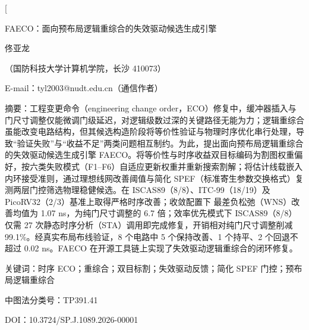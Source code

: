 \documentclass[twocolumn,10pt]{ctexart}
\let\songti\songfamily\let\heiti\heifamily\let\fangsong\fangfamily
\begin{document}
\pagestyle{plain}

\twocolumn[
\begin{center}
{\heiti{} FAECO：面向预布局逻辑重综合的失效驱动候选生成引擎}\par
\vspace{6pt}
{\fangsong{} 佟亚龙}\par
\vspace{4pt}
{\songti\fontsize{8}{12}\selectfont（国防科技大学计算机学院，长沙 410073）}\par\vspace{2pt}
{\songti\fontsize{8}{12}\selectfont E-mail：tyl2003@nudt.edu.cn（通信作者）}\par
\vspace{8pt}
\end{center}
\begin{flushleft}
{\heiti\fontsize{8.5}{13}\selectfont 摘\quad 要：}{\songti\fontsize{8.5}{13}\selectfont 工程变更命令（engineering change order，ECO）修复中，缓冲器插入与门尺寸调整仅能微调门级延迟，对逻辑级数过深的关键路径无能为力；逻辑重综合虽能改变电路结构，但其候选构造阶段将等价性验证与物理时序优化串行处理，导致“验证失败”与“收益不足”两类问题相互制约。为此，提出面向预布局逻辑重综合的失效驱动候选生成引擎 FAECO。将等价性与时序收益双目标编码为割图权重偏好，按六类失败模式（F1--F6）自适应更新权重并重新搜索割解；将估计线载嵌入内环接受准则，通过理想线网改善阈值与简化 SPEF（标准寄生参数交换格式）复测两层门控筛选物理稳健候选。在 ISCAS89（8/8）、ITC-99（18/19）及 PicoRV32（2/3）基准上取得严格时序改善；收敛配置下 最差负松弛（WNS）改善均值为 1.07 ns，为纯门尺寸调整的 6.7 倍；效率优先模式下 ISCAS89（8/8）仅需 27 次静态时序分析（STA）调用即完成修复，开销相对纯门尺寸调整削减 99.1\%。经真实布局布线验证，8 个电路中 5 个保持改善、1 个持平、2 个回退不超过 0.02 ns。FAECO 在开源工具链上实现了失效驱动逻辑重综合的闭环修复。}
\par
\vspace{4pt}
{\heiti\fontsize{8.5}{13}\selectfont 关键词：}{\songti\fontsize{8.5}{13}\selectfont 时序 ECO；重综合；双目标割；失效驱动反馈；简化 SPEF 门控；预布局逻辑重综合}\par
\vspace{2pt}
{\songti\fontsize{8.5}{13}\selectfont 中图法分类号：TP391.41}\par
\vspace{2pt}
{\songti\fontsize{8.5}{13}\selectfont DOI：10.3724/SP.J.1089.2026-00001}
\end{flushleft}
\end{document}
